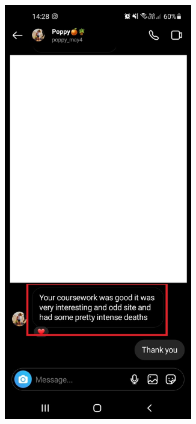 \begin{figure}[H]
    \begin{minipage}{0.45\textwidth}
        \begin{figure}[H]
        \centering
        \includegraphics[width=0.9\textwidth]{images/evalutation/Evidence from Poppy.jpg}

\end{figure}
\end{minipage}
\end{figure}
